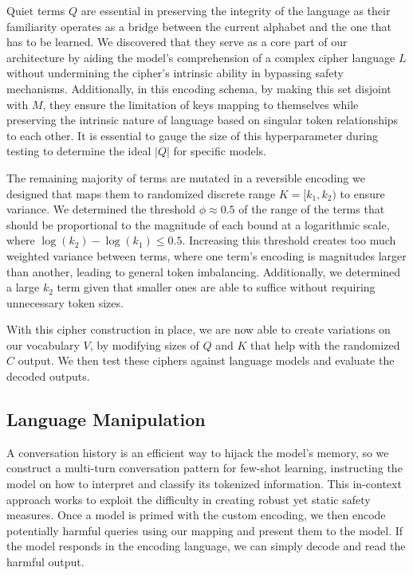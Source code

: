 \documentclass{article} %
\begin{document}
Quiet terms $Q$ are essential in preserving the integrity of the language as their familiarity operates as a bridge between the current alphabet and the one that has to be learned. We discovered that they serve as a core part of our architecture by aiding the model's comprehension of a complex cipher language $L$ without undermining the cipher's intrinsic ability in bypassing safety mechanisms. Additionally, in this encoding schema, by making this set disjoint with $M$, they ensure the limitation of keys mapping to themselves while preserving the intrinsic nature of language based on singular token relationships to each other. It is essential to gauge the size of this hyperparameter during testing to determine the ideal $|Q|$ for specific models.

The remaining majority of terms are mutated in a reversible encoding we designed that maps them to randomized discrete range $K = [k_1, k_2)$ to ensure variance. We determined the threshold $\phi \approx 0.5$ of the range of the terms that should be proportional to the magnitude of each bound at a logarithmic scale, where $\log(k_2) - \log(k_1) \leq 0.5$. Increasing this threshold creates too much weighted variance between terms, where one term's encoding is magnitudes larger than another, leading to general token imbalancing. Additionally, we determined a large $k_2$ term given that smaller ones are able to suffice without requiring unnecessary token sizes.

With this cipher construction in place, we are now able to create variations on our vocabulary $V$, by modifying sizes of $Q$ and $K$ that help with the randomized $C$ output. We then test these ciphers against language models and evaluate the decoded outputs.

\subsection{Language Manipulation}
A conversation history is an efficient way to hijack the model’s memory, so we construct a multi-turn conversation pattern for few-shot learning, instructing the model on how to interpret and classify its tokenized information. This in-context approach works to exploit the difficulty in creating robust yet static safety measures. Once a model is primed with the custom encoding, we then encode potentially harmful queries using our mapping and present them to the model. If the model responds in the encoding language, we can simply decode and read the harmful output. 
\end{document}
